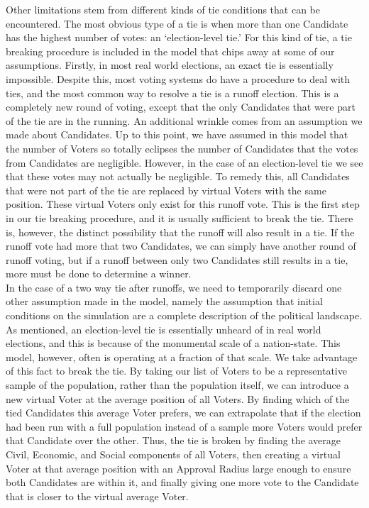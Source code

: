 \documentclass[12pt]{article}
\newcounter{step}
\begin{document}
\qquad Other limitations stem from different kinds of tie conditions that can be encountered. The most obvious type of a tie is when more than one Candidate has the highest number of votes: an `election-level tie.' For this kind of tie, a tie breaking procedure is included in the model that chips away at some of our assumptions. Firstly, in most real world elections, an exact tie is essentially impossible. Despite this, most voting systems do have a procedure to deal with ties, and the most common way to resolve a tie is a runoff election. This is a completely new round of voting, except that the only Candidates that were part of the tie are in the running. An additional wrinkle comes from an assumption we made about Candidates. Up to this point, we have assumed in this model that the number of Voters so totally eclipses the number of Candidates that the votes from Candidates are negligible. However, in the case of an election-level tie we see that these votes may not actually be negligible. To remedy this, all Candidates that were not part of the tie are replaced by virtual Voters with the same position. These virtual Voters only exist for this runoff vote. This is the first step in our tie breaking procedure, and it is usually sufficient to break the tie. There is, however, the distinct possibility that the runoff will also result in a tie. If the runoff vote had more that two Candidates, we can simply have another round of runoff voting, but if a runoff between only two Candidates still results in a tie, more must be done to determine a winner. \\

\qquad In the case of a two way tie after runoffs, we need to temporarily discard one other assumption made in the model, namely the assumption that initial conditions on the simulation are a complete description of the political landscape. As mentioned, an election-level tie is essentially unheard of in real world elections, and this is because of the monumental scale of a nation-state. This model, however, often is operating at a fraction of that scale. We take advantage of this fact to break the tie. By taking our list of Voters to be a representative sample of the population, rather than the population itself, we can introduce a new virtual Voter at the average position of all Voters. By finding which of the tied Candidates this average Voter prefers, we can extrapolate that if the election had been run with a full population instead of a sample more Voters would prefer that Candidate over the other. Thus, the tie is broken by finding the average Civil, Economic, and Social components of all Voters, then creating a virtual Voter at that average position with an Approval Radius large enough to ensure both Candidates are within it, and finally giving one more vote to the Candidate that is closer to the virtual average Voter. \\
\end{document}
